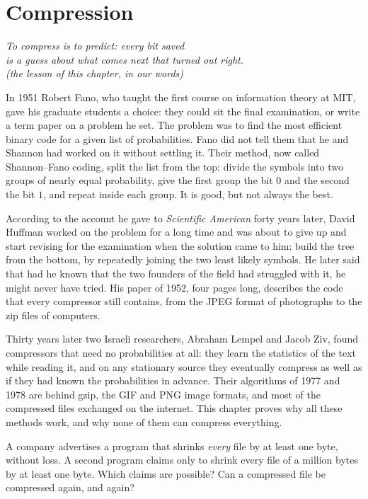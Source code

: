 \chapter{Compression}\label{ch:compression}

\begin{center}\itshape
To compress is to predict: every bit saved\\
is a guess about what comes next that turned out right.\\
\upshape(the lesson of this chapter, in our words)
\end{center}

In 1951 Robert Fano, who taught the first course on information theory at MIT, gave his graduate students a choice: they could sit the final examination, or write a term paper on a problem he set. The problem was to find the most efficient binary code for a given list of probabilities. Fano did not tell them that he and Shannon had worked on it without settling it. Their method, now called Shannon--Fano coding, split the list from the top: divide the symbols into two groups of nearly equal probability, give the first group the bit $0$ and the second the bit $1$, and repeat inside each group. It is good, but not always the best.

According to the account he gave to \emph{Scientific American} forty years later, David Huffman worked on the problem for a long time and was about to give up and start revising for the examination when the solution came to him: build the tree from the bottom, by repeatedly joining the two least likely symbols. He later said that had he known that the two founders of the field had struggled with it, he might never have tried. His paper of 1952, four pages long, describes the code that every compressor still contains, from the JPEG format of photographs to the zip files of computers.

Thirty years later two Israeli researchers, Abraham Lempel and Jacob Ziv, found compressors that need no probabilities at all: they learn the statistics of the text while reading it, and on any stationary source they eventually compress as well as if they had known the probabilities in advance. Their algorithms of 1977 and 1978 are behind gzip, the GIF and PNG image formats, and most of the compressed files exchanged on the internet. This chapter proves why all these methods work, and why none of them can compress everything.

\begin{think}
A company advertises a program that shrinks \emph{every} file by at least one byte, without loss. A second program claims only to shrink every file of a million bytes by at least one byte. Which claims are possible? Can a compressed file be compressed again, and again?
\end{think}

